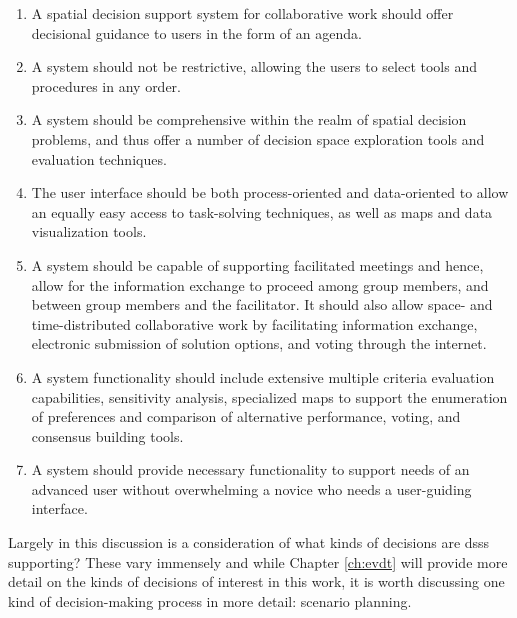 \begin{enumerate}
    \setlength{\itemsep}{0pt}%
    \setlength{\parskip}{0pt}%
	\item{A spatial decision support system for collaborative work should offer decisional guidance to users in the form of an agenda.}
	\item{A system should not be restrictive, allowing the users to select tools and procedures in any order.}
	\item{A system should be comprehensive within the realm of spatial decision problems, and thus offer a number of decision space exploration tools and evaluation techniques.}
	\item{The user interface should be both process-oriented and data-oriented to allow an equally easy access to task-solving techniques, as well as maps and data visualization tools.}
	\item{A system should be capable of supporting facilitated meetings and hence, allow for the information exchange to proceed among group members, and between group members and the facilitator. It should also allow space- and time-distributed collaborative work by facilitating information exchange, electronic submission of solution options, and voting through the internet.}
	\item{A system functionality should include extensive multiple criteria evaluation capabilities, sensitivity analysis, specialized maps to support the enumeration of preferences and comparison of alternative performance, voting, and consensus building tools.}
	\item{A system should provide necessary functionality to support needs of an advanced user without overwhelming a novice who needs a user-guiding interface.}
\end{enumerate}

Largely in this discussion is a consideration of what kinds of decisions are \acp{dss} supporting? These vary immensely and while Chapter \ref{ch:evdt} will provide more detail on the kinds of decisions of interest in this work, it is worth discussing one kind of decision-making process in more detail: scenario planning.

\subsubsection{}

